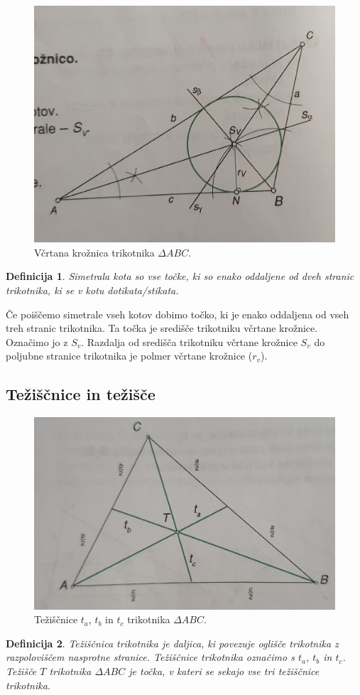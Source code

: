 \documentclass{article}
\newtheorem{definicija}{Definicija}[subsection]
\begin{document}
\begin{figure}[h]
    \includegraphics[width=\linewidth]{vcrtanaKroznica.png}
    \centering
    \caption{Včrtana krožnica trikotnika $\Delta ABC$.}
\end{figure}

\begin{definicija}
    Simetrala kota so vse točke, ki so enako oddaljene od dveh stranic trikotnika, ki se v kotu dotikata/stikata. 
\end{definicija}

Če poiščemo simetrale vseh kotov dobimo točko, ki je enako oddaljena od vseh treh stranic trikotnika. Ta točka je središče trikotniku včrtane krožnice. Označimo jo z $S_v$. Razdalja od središča trikotniku včrtane krožnice $S_v$ do poljubne stranice trikotnika je polmer včrtane krožnice ($r_v$).


\pagebreak
\subsection{ Težiščnice in težišče }

\begin{figure}[h]
    \includegraphics[width=\linewidth]{teziscniceTrikotnika.png}
    \centering
    \caption{ Težiščnice $t_a$, $t_b$ in $t_c$ trikotnika $\Delta ABC$.}
\end{figure}

\begin{definicija}
    Težiščnica trikotnika je daljica, ki povezuje oglišče trikotnika z razpoloviščem nasprotne stranice. Težiščnice trikotnika označimo s $t_a$, $t_b$ in $t_c$. Težišče $T$ trikotnika $\Delta ABC$ je točka, v kateri se sekajo vse tri težiščnice trikotnika.
\end{definicija}
\end{document}
